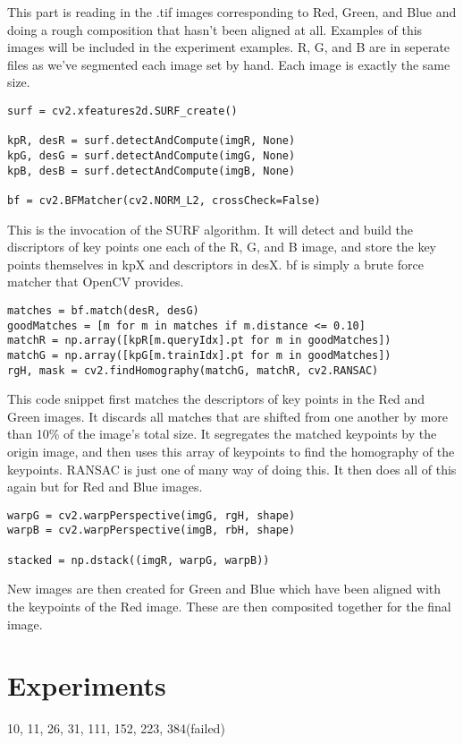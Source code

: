 \documentclass[10pt]{IEEEtran}
\begin{document}
This part is reading in the .tif images corresponding to Red, Green, and Blue and doing a rough composition that hasn't been aligned at all. Examples of this images will be included in the experiment examples. R, G, and B are in seperate files as we've segmented each image set by hand. Each image is exactly the same size. 

\begin{lstlisting}
surf = cv2.xfeatures2d.SURF_create()

kpR, desR = surf.detectAndCompute(imgR, None)
kpG, desG = surf.detectAndCompute(imgG, None)
kpB, desB = surf.detectAndCompute(imgB, None)

bf = cv2.BFMatcher(cv2.NORM_L2, crossCheck=False)
\end{lstlisting}

This is the invocation of the SURF algorithm. It will detect and build the discriptors of key points one each of the R, G, and B image, and store the key points themselves in kpX and descriptors in desX. bf is simply a brute force matcher that OpenCV provides. 

\begin{lstlisting}
matches = bf.match(desR, desG)
goodMatches = [m for m in matches if m.distance <= 0.10]
matchR = np.array([kpR[m.queryIdx].pt for m in goodMatches])
matchG = np.array([kpG[m.trainIdx].pt for m in goodMatches])
rgH, mask = cv2.findHomography(matchG, matchR, cv2.RANSAC)
\end{lstlisting}

This code snippet first matches the descriptors of key points in the Red and Green images. It discards all matches that are shifted from one another by more than 10\% of the image's total size. It segregates the matched keypoints by the origin image, and then uses this array of keypoints to find the homography of the keypoints. RANSAC is just one of many way of doing this. It then does all of this again but for Red and Blue images. 

\begin{lstlisting}
warpG = cv2.warpPerspective(imgG, rgH, shape)
warpB = cv2.warpPerspective(imgB, rbH, shape)

stacked = np.dstack((imgR, warpG, warpB))
\end{lstlisting}

New images are then created for Green and Blue which have been aligned with the keypoints of the Red image. These are then composited together for the final image. 

\section{Experiments}

10, 11, 26, 31, 111, 152, 223, 384(failed)



		

%	
%	
\end{document}
